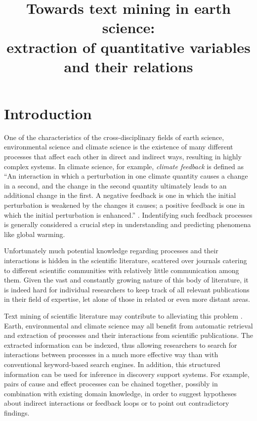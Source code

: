 \documentclass[10pt, a4paper]{article}
\title{Towards text mining in earth science:\\
extraction of quantitative variables and their relations}
\begin{document}
\maketitleabstract

\section{Introduction}

One of the characteristics of the cross-disciplinary fields of earth science, environmental science and climate science is the existence of many different processes that affect each other in direct and indirect ways, resulting in highly complex systems.
In climate science, for example, \emph{climate feedback} is defined as ``An interaction in which a perturbation in one climate quantity causes a change in a second, and the change in the
second quantity ultimately leads to an additional change in the first. 
A negative feedback is one in which the initial perturbation is weakened
by the changes it causes; a positive feedback is one in which the initial
perturbation is enhanced.'' \cite{stocker2013climate}.
Indentifying such feedback processes is generally considered a crucial step in understanding and predicting phenomena like global warming.

Unfortunately much potential knowledge regarding processes and their interactions is hidden in the scientific literature, scattered over journals catering to different scientific communities with relatively little communication among them.
Given the vast and constantly growing nature of this body of literature, it is indeed hard for individual researchers to keep track of all relevant publications in their field of expertise, let alone of those in related or even more distant areas.   

Text mining of scientific literature may contribute to alleviating this problem \cite{Etzioni2011Search} .
Earth, environmental and climate science may all benefit from automatic retrieval and extraction of processes and their interactions from scientific publications.
The extracted information can be indexed, thus allowing researchers to search for interactions between processes in a much more effective way than with conventional keyword-based search engines.
In addition, this structured information can be used for inference in discovery support systems.
For example, pairs of cause and effect processes can be chained together, possibly in combination with existing domain knowledge, in order to suggest hypotheses about indirect interactions or feedback loops or to point out contradictory findings.
\end{document}
